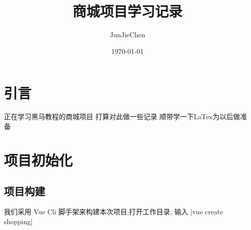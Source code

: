 \documentclass[a4paper,12pt]{article}
\begin{document}
\title{商城项目学习记录}
\author{JunJieChen}
\date{\today}
\maketitle
\section{引言}
正在学习黑马教程的商城项目
打算对此做一些记录
顺带学一下LaTex为以后做准备

\section{项目初始化}
\subsection{项目构建}
我们采用 Vue Cli 脚手架来构建本次项目;打开工作目录, 输入
\listinline|vue create shopping| 
\end{document}
